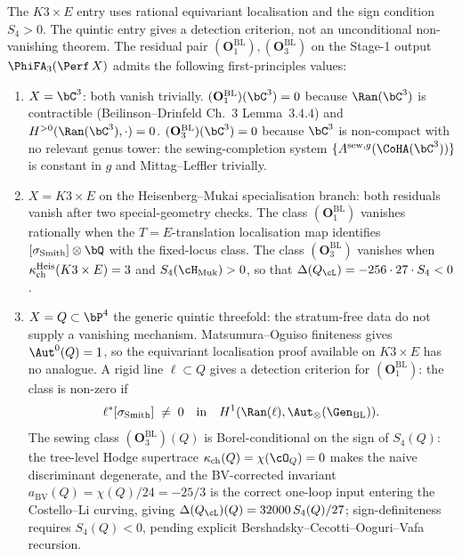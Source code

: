 \begin{theorem}
\label{thm:residual-pair-three-values}
The $K3\times E$ entry uses rational equivariant localisation and the
sign condition $S_4>0$. The quintic entry gives a detection criterion,
not an unconditional non-vanishing theorem.
The residual pair
$(\mathbf{O}_1^{\mathrm{BL}}), (\mathbf{O}_3^{\mathrm{BL}})$
on the Stage-1 output $\PhiFA_3(\Perf\,X)$ admits the following
first-principles values:
\begin{enumerate}[label=\emph{(\roman*)}, leftmargin=2.5em]
\item $X = \bC^3$: both vanish trivially.
$(\mathbf{O}_1^{\mathrm{BL}})(\bC^3) = 0$ because
$\Ran(\bC^3)$ is contractible (Beilinson--Drinfeld Ch.~$3$
Lemma~$3.4.4$) and $H^{>0}(\Ran(\bC^3), \cdot) = 0$.
$(\mathbf{O}_3^{\mathrm{BL}})(\bC^3) = 0$ because $\bC^3$ is
non-compact with no relevant genus tower: the sewing-completion
system $\{A^{\mathrm{sew}, g}(\CoHA(\bC^3))\}$ is constant in $g$
and Mittag--Leffler trivially.

\item $X = K3 \times E$ on the Heisenberg--Mukai specialisation branch:
both residuals vanish after two special-geometry checks. The class
$(\mathbf{O}_1^{\mathrm{BL}})$ vanishes rationally when the
$T=E$-translation localisation map identifies
$[\sigma_{\mathrm{Smith}}]\otimes\bQ$ with the fixed-locus class. The
class $(\mathbf{O}_3^{\mathrm{BL}})$ vanishes when
$\kappa_{\mathrm{ch}}^{\mathrm{Heis}}(K3 \times E)=3$ and
$S_4(\cH_{\mathrm{Muk}})>0$, so that
$\Delta(Q_\cL)=-256\cdot 27\cdot S_4<0$.

\item $X = Q \subset \bP^4$ the generic quintic threefold: the
stratum-free data do not supply a vanishing mechanism. Matsumura--Oguiso
finiteness gives $\Aut^0(Q)=1$, so the equivariant localisation proof
available on $K3\times E$ has no analogue. A rigid line
$\ell\subset Q$ gives a detection criterion for
$(\mathbf{O}_1^{\mathrm{BL}})$: the class is non-zero if
\[
 \ell^*[\sigma_{\mathrm{Smith}}]\;\neq\;0
 \quad\text{in}\quad
 H^1(\Ran(\ell),\Aut_\otimes(\Gen_{\mathrm{BL}})).
\]
The sewing class $(\mathbf{O}_3^{\mathrm{BL}})(Q)$ is Borel-conditional
on the sign of $S_4(Q)$: the tree-level Hodge supertrace
$\kch(Q) = \chi(\cO_Q) = 0$ makes the naive discriminant
degenerate, and the BV-corrected invariant
$a_{\mathrm{BV}}(Q) = \chi(Q)/24 = -25/3$ is the correct one-loop
input entering the Costello--Li curving, giving
$\Delta(Q_\cL)(Q) = 32000\, S_4(Q)/27$; sign-definiteness
requires $S_4(Q) < 0$, pending explicit Bershadsky--Cecotti--Ooguri--Vafa
recursion.
\end{enumerate}
\end{theorem}

